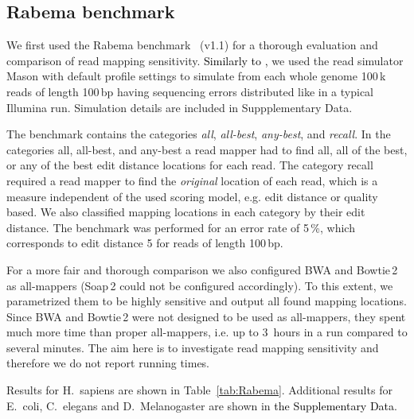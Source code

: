 \documentclass[a4,center,fleqn]{article}
\newcommand{\eg}{{e.g.}\xspace}
\newcommand{\ie}{{i.e.}\xspace}
\begin{document}
\subsection{Rabema benchmark}

We first used the Rabema benchmark~\cite{Holtgrewe2011} (v1.1) for a thorough evaluation and comparison of read mapping sensitivity.
\textcolor{black}{Similarly to \cite{Bowtie2}, }we used the read simulator Mason \cite{SeqAnReadSimulator} with default profile settings to simulate from each whole genome 100\,k reads of length 100\,bp having sequencing errors distributed like in a typical Illumina run.
Simulation details are included in Suppplementary Data.

The benchmark contains the categories \emph{all}, \emph{all-best}, \emph{any-best}, and \emph{recall}.
In the categories all, all-best, and any-best a read mapper had to find all, all of the best, or any of the best edit distance locations for each read.
The category recall required a read mapper to find the \emph{original} location of each read, which is a measure independent of the used scoring model, \eg edit distance or quality based.
We also classified mapping locations in each category by their edit distance.
The benchmark was performed for an error rate of 5\,\%, which corresponds to edit distance 5 for reads of length 100\,bp.

For a more fair and thorough comparison we also configured BWA and Bowtie\,2 as all-mappers (Soap\,2 could not be configured accordingly).
To this extent, we parametrized them to be highly sensitive and output all found mapping locations.
Since BWA and Bowtie\,2 were not designed to be used as all-mappers, they spent much more time than proper all-mappers, \ie up to 3~hours in a run compared to several minutes.
The aim here is to investigate read mapping sensitivity and therefore we do not report running times.

Results for H.~sapiens are shown in Table~\ref{tab:Rabema}.
Additional results for E.~coli, C.~elegans and D.~Melanogaster are shown in \textcolor{black}{the Supplementary Data}.
\end{document}
